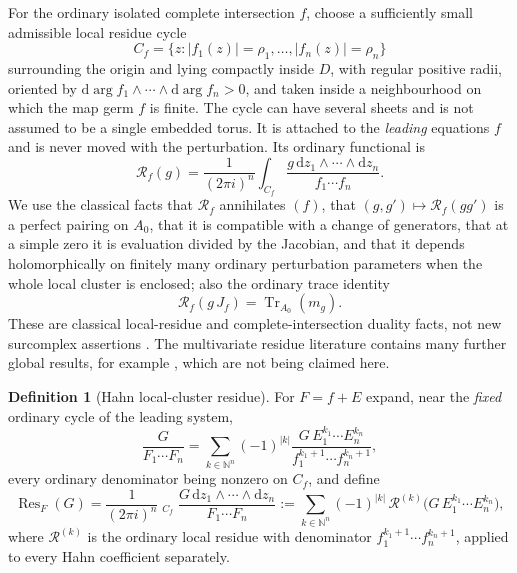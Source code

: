 \documentclass[11pt,letterpaper]{article}
\theoremstyle{definition}
\newtheorem{definition}[theorem]{Definition}
\theoremstyle{remark}
\newcommand{\N}{\mathbb N}
\newcommand{\dd}{\mathrm d}
\newcommand{\HInt}{\mathop{\int^{\,H}}\nolimits}
\DeclareMathOperator{\Res}{Res}
\DeclareMathOperator{\Tr}{Tr}
\numberwithin{equation}{section}
\begin{document}
For the ordinary isolated complete intersection $f$, choose a sufficiently small admissible local residue cycle
\[
 C_f=\{z:|f_1(z)|=\rho_1,\ldots,|f_n(z)|=\rho_n\}
\]
surrounding the origin and lying compactly inside $D$, with regular positive radii, oriented by $\dd\arg f_1\wedge\cdots\wedge\dd\arg f_n>0$, and taken inside a neighbourhood on which the map germ $f$ is finite. The cycle can have several sheets and is not assumed to be a single embedded torus. It is attached to the \emph{leading} equations $f$ and is never moved with the perturbation. Its ordinary functional is
\begin{equation}\label{finite:eq:ordinaryresidue}
 \mathcal R_f(g)=\frac1{(2\pi i)^n}\int_{C_f}
 \frac{g\,\dd z_1\wedge\cdots\wedge\dd z_n}{f_1\cdots f_n}.
\end{equation}
We use the classical facts that $\mathcal R_f$ annihilates $(f)$, that $(g,g')\mapsto\mathcal R_f(gg')$ is a perfect pairing on $A_0$, that it is compatible with a change of generators, that at a simple zero it is evaluation divided by the Jacobian, and that it depends holomorphically on finitely many ordinary perturbation parameters when the whole local cluster is enclosed; also the ordinary trace identity
\begin{equation}\label{finite:eq:ordinarytrace}
 \mathcal R_f(g\,J_f)=\Tr_{A_0}(m_g).
\end{equation}
These are classical local-residue and complete-intersection duality facts, not new surcomplex assertions \cite{finite:GriffithsHarris,finite:Hartshorne,finite:Kunz,finite:CattaniDickenstein,finite:NayakSastry}. The multivariate residue literature contains many further global results, for example \cite{finite:CDS}, which are not being claimed here.

\begin{definition}[Hahn local-cluster residue]
\label{finite:def:residue}
For $F=f+E$ expand, near the \emph{fixed} ordinary cycle of the leading system,
\begin{equation}\label{finite:eq:residueexpansion}
 \frac{G}{F_1\cdots F_n}
 =\sum_{k\in\N^n}(-1)^{|k|}
 \frac{G\,E_1^{k_1}\cdots E_n^{k_n}}{f_1^{k_1+1}\cdots f_n^{k_n+1}},
\end{equation}
every ordinary denominator being nonzero on $C_f$, and define
\begin{equation}\label{finite:eq:Hresidue}
 \Res_F(G)=\frac1{(2\pi i)^n}\HInt_{C_f}
 \frac{G\,\dd z_1\wedge\cdots\wedge\dd z_n}{F_1\cdots F_n}
 :=\sum_{k\in\N^n}(-1)^{|k|}\,
 \mathcal R^{(k)}\bigl(G\,E_1^{k_1}\cdots E_n^{k_n}\bigr),
\end{equation}
where $\mathcal R^{(k)}$ is the ordinary local residue with denominator $f_1^{k_1+1}\cdots f_n^{k_n+1}$, applied to every Hahn coefficient separately.
\end{definition}
\end{document}
